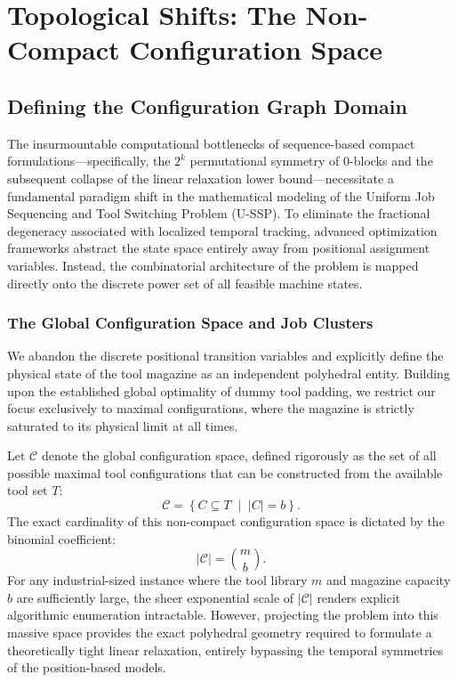 \documentclass[11pt, a4paper]{book}
\begin{document}
	\chapter{Topological Shifts: The Non-Compact Configuration Space}
	
	\section{Defining the Configuration Graph Domain}
	
	The insurmountable computational bottlenecks of sequence-based compact formulations---specifically, the $2^k$ permutational symmetry of 0-blocks and the subsequent collapse of the linear relaxation lower bound---necessitate a fundamental paradigm shift in the mathematical modeling of the Uniform Job Sequencing and Tool Switching Problem (U-SSP). To eliminate the fractional degeneracy associated with localized temporal tracking, advanced optimization frameworks abstract the state space entirely away from positional assignment variables. Instead, the combinatorial architecture of the problem is mapped directly onto the discrete power set of all feasible machine states.
	
	\subsection{The Global Configuration Space and Job Clusters}
	
	We abandon the discrete positional transition variables and explicitly define the physical state of the tool magazine as an independent polyhedral entity. Building upon the established global optimality of dummy tool padding, we restrict our focus exclusively to maximal configurations, where the magazine is strictly saturated to its physical limit at all times. 
	
	Let $\mathcal{C}$ denote the global configuration space, defined rigorously as the set of all possible maximal tool configurations that can be constructed from the available tool set $T$:
	\begin{equation}
		\mathcal{C} = \left\{ C \subseteq T \;\middle|\; |C| = b \right\}.
	\end{equation}
	The exact cardinality of this non-compact configuration space is dictated by the binomial coefficient:
	\begin{equation}
		|\mathcal{C}| = \binom{m}{b}.
	\end{equation}
	For any industrial-sized instance where the tool library $m$ and magazine capacity $b$ are sufficiently large, the sheer exponential scale of $|\mathcal{C}|$ renders explicit algorithmic enumeration intractable. However, projecting the problem into this massive space provides the exact polyhedral geometry required to formulate a theoretically tight linear relaxation, entirely bypassing the temporal symmetries of the position-based models.
	
\end{document}

